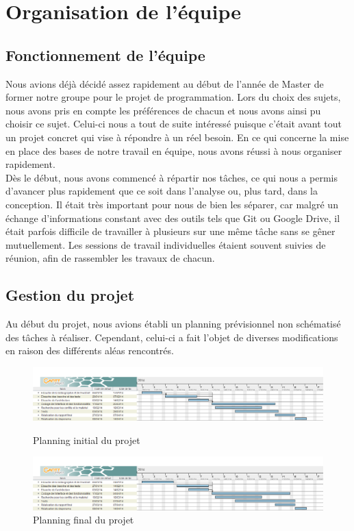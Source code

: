 \documentclass[17pts]{report}
\begin{document}
\chapter{Organisation de l'équipe}
\label{cha:Organisation de l'équipe}
    \section{Fonctionnement de l'équipe}
    \label{sec:Fonctionnement de l'équipe}
Nous avions déjà décidé assez rapidement au début de l'année de Master de
former notre groupe pour le projet de programmation. Lors du choix des sujets,
nous avons pris en compte les préférences de chacun et nous avons ainsi pu
choisir ce sujet. Celui-ci nous a tout de suite intéressé puisque c'était avant
tout un projet concret qui vise à répondre à un réel besoin.  En ce qui
concerne la mise en place des bases de notre travail en équipe, nous avons
réussi à nous organiser rapidement.  \\

Dès le début, nous avons commencé à répartir nos tâches, ce qui nous a permis
d’avancer plus rapidement que ce soit dans l’analyse ou, plus tard, dans la
conception. Il était très important pour nous de bien les séparer, car malgré
un échange d’informations constant avec des outils tels que Git ou Google
Drive, il était parfois difficile de travailler à plusieurs sur une même tâche
sans se gêner mutuellement. Les sessions de travail individuelles étaient
souvent suivies de réunion, afin de rassembler les travaux de chacun.  \\

    \section{Gestion du projet}
    \label{sec:Gestion du projet}
    Au début du projet, nous avions établi un planning prévisionnel non
    schématisé des tâches à réaliser. Cependant, celui-ci a fait l'objet de
    diverses modifications en raison des différents aléas rencontrés.

    \begin{figure}
        \includegraphics[scale=0.5]{./illustrations/planning_initial_pdp.png}
        \centering
        \caption{Planning initial du projet}
        \label{fig:PlanningInitial}
        \vspace{10.00mm}
        \includegraphics[scale=0.5]{./illustrations/planning_final_pdp.png}
        \centering
        \caption{Planning final du projet}
        \label{fig:PlanningFinal}
    \end{figure}
\end{document}
